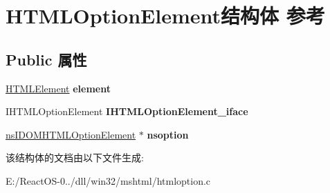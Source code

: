 \hypertarget{struct_h_t_m_l_option_element}{}\section{H\+T\+M\+L\+Option\+Element结构体 参考}
\label{struct_h_t_m_l_option_element}
\subsection*{Public 属性}
\begin{DoxyCompactItemize}
\item 
\mbox{\label{struct_h_t_m_l_option_element_a450f6edd95a5a667be560153e664f5ae}} 
\hyperlink{struct_h_t_m_l_element}{H\+T\+M\+L\+Element} {\bfseries element}
\item 
\mbox{\label{struct_h_t_m_l_option_element_adf71a7dc6c6c54c428f6d13bb4129ad6}} 
I\+H\+T\+M\+L\+Option\+Element {\bfseries I\+H\+T\+M\+L\+Option\+Element\+\_\+iface}
\item 
\mbox{\label{struct_h_t_m_l_option_element_a382ebc40a88b1d42d8c69d1963695205}} 
\hyperlink{interfacens_i_d_o_m_h_t_m_l_option_element}{ns\+I\+D\+O\+M\+H\+T\+M\+L\+Option\+Element} $\ast$ {\bfseries nsoption}
\end{DoxyCompactItemize}


该结构体的文档由以下文件生成\+:\begin{DoxyCompactItemize}
\item 
E\+:/\+React\+O\+S-\/0../dll/win32/mshtml/htmloption.\+c\end{DoxyCompactItemize}
